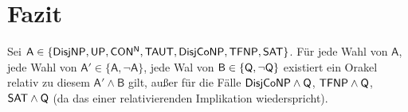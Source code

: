 \chapter{Fazit}\label{chap:conclusion}


\begin{corollary}
    Sei $\mathsf A \in \{\mathsf{DisjNP}, \mathsf{UP}, \mathsf{CON^{N}}, \mathsf{TAUT}, \mathsf{DisjCoNP}, \mathsf{TFNP}, \mathsf{SAT}\}$.
    Für jede Wahl von $\mathsf A$, jede Wahl von $\mathsf A' \in\{\mathsf A, \neg\mathsf A\}$, jede Wal von $\mathsf B\in \{\mathsf{Q}, \neg\mathsf{Q}\}$ existiert ein Orakel relativ zu diesem $\mathsf A'\land \mathsf B$ gilt, außer für die Fälle $\mathsf{DisjCoNP}\land\mathsf{Q}$, $\mathsf{TFNP}\land\mathsf{Q}$, $\mathsf{SAT}\land\mathsf{Q}$ (da das einer relativierenden Implikation wiederspricht).
\end{corollary}
